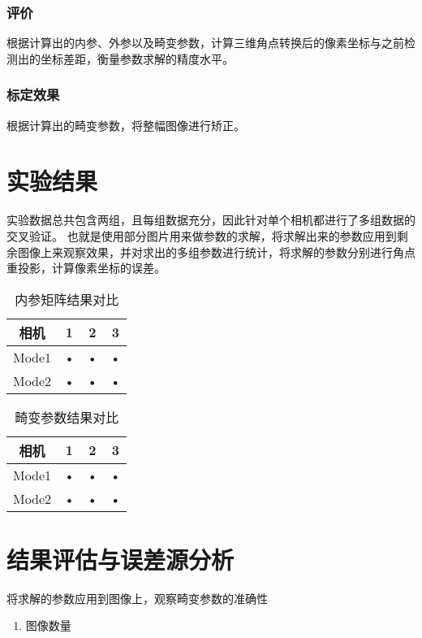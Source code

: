 \documentclass[10pt,a4paper]{article}
\begin{document}
\begin{CJK*}{UTF8}{gbsn}
\subsubsection{评价}
根据计算出的内参、外参以及畸变参数，计算三维角点转换后的像素坐标与之前检测出的坐标差距，衡量参数求解的精度水平。
\subsubsection{标定效果}
根据计算出的畸变参数，将整幅图像进行矫正。


\section{实验结果}
实验数据总共包含两组，且每组数据充分，因此针对单个相机都进行了多组数据的交叉验证。
也就是使用部分图片用来做参数的求解，将求解出来的参数应用到剩余图像上来观察效果，并对求出的多组参数进行统计，将求解的参数分别进行角点重投影，计算像素坐标的误差。

\begin{table}[htbp]
\centering
\caption{内参矩阵结果对比}
	\begin{tabular}{|c|c|c|c|}
	\hline 
	相机 & 1 & 2 & 3 \\ 
	\hline 
	Mode1 & • & • & • \\ 
	\hline 
	Mode2 & • & • & • \\ 
	\hline 
	\end{tabular} 
\end{table}

\begin{table}[htbp]
    \centering
    \caption{畸变参数结果对比}
        \begin{tabular}{|c|c|c|c|}
        \hline 
        相机 & 1 & 2 & 3 \\ 
        \hline 
        Mode1 & • & • & • \\ 
        \hline 
        Mode2 & • & • & • \\ 
        \hline 
        \end{tabular} 
    \end{table}

\section{结果评估与误差源分析}
将求解的参数应用到图像上，观察畸变参数的准确性

\begin{enumerate}[(1)]
    \item 图像数量
    

\end{enumerate}
\end{CJK*}
\end{document}
